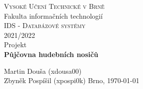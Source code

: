 \documentclass{article}
\begin{document}
\clearpage
\begin{titlepage}
	\begin{center}
		\textsc{\LARGE Vysoké Učení Technické v Brně}\\[0.5cm]
		{\LARGE Fakulta informačních technologií }\\[4.0cm]

		\textsc{\LARGE IDS - Databázové systémy}\\[0.5cm]
		\textsc{\LARGE 2021/2022}\\[3.5cm]

		{\LARGE Projekt}\\[0.5cm]
    {\LARGE \textbf{Půjčovna hudebních nosičů}}\\
	\end{center}

	\vfill 

	\begin{flushleft} 
		\large
		Martin Douša (xdousa00)\\
    Zbyněk Pospíšil (xpospi0k)
		\hfill
		Brno, \today
	\end{flushleft}
\end{titlepage}
\thispagestyle{empty}

\newpage
\tableofcontents

\newpage
\listoffigures

\newpage





\end{document}
